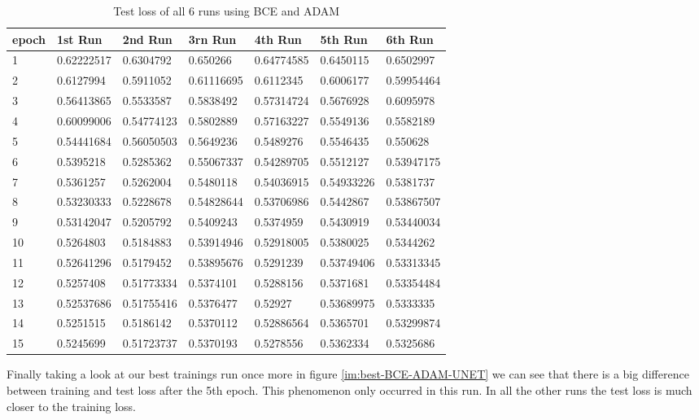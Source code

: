 \begin{table}[!ht]
    \centering
    \begin{tabular}{|l||l||l||l||l||l||l|}
    \hline
    epoch & 1st Run & 2nd Run & 3rn Run & 4th Run & 5th Run & 6th Run \\ \hline
        1 & 0.62222517 & 0.6304792 & 0.650266 & 0.64774585 & 0.6450115 & 0.6502997 \\ \hline
        2 & 0.6127994 & 0.5911052 & 0.61116695 & 0.6112345 & 0.6006177 & 0.59954464 \\ \hline
        3 & 0.56413865 & 0.5533587 & 0.5838492 & 0.57314724 & 0.5676928 & 0.6095978 \\ \hline
        4 & 0.60099006 & 0.54774123 & 0.5802889 & 0.57163227 & 0.5549136 & 0.5582189 \\ \hline
        5 & 0.54441684 & 0.56050503 & 0.5649236 & 0.5489276 & 0.5546435 & 0.550628 \\ \hline
        6 & 0.5395218 & 0.5285362 & 0.55067337 & 0.54289705 & 0.5512127 & 0.53947175 \\ \hline
        7 & 0.5361257 & 0.5262004 & 0.5480118 & 0.54036915 & 0.54933226 & 0.5381737 \\ \hline
        8 & 0.53230333 & 0.5228678 & 0.54828644 & 0.53706986 & 0.5442867 & 0.53867507 \\ \hline
        9 & 0.53142047 & 0.5205792 & 0.5409243 & 0.5374959 & 0.5430919 & 0.53440034 \\ \hline
        10 & 0.5264803 & 0.5184883 & 0.53914946 & 0.52918005 & 0.5380025 & 0.5344262 \\ \hline
        11 & 0.52641296 & 0.5179452 & 0.53895676 & 0.5291239 & 0.53749406 & 0.53313345 \\ \hline
        12 & 0.5257408 & 0.51773334 & 0.5374101 & 0.5288156 & 0.5371681 & 0.53354484 \\ \hline
        13 & 0.52537686 & 0.51755416 & 0.5376477 & 0.52927 & 0.53689975 & 0.5333335 \\ \hline
        14 & 0.5251515 & 0.5186142 & 0.5370112 & 0.52886564 & 0.5365701 & 0.53299874 \\ \hline
        15 & 0.5245699 & 0.51723737 & 0.5370193 & 0.5278556 & 0.5362334 & 0.5325686 \\ \hline
    \end{tabular}
    \caption{\label{tab:bce_adam_test}Test loss of all 6 runs using BCE and ADAM}
\end{table}


Finally taking a look at our best trainings run once more in figure \ref{im:best-BCE-ADAM-UNET} we can see that 
there is a big difference between training and test loss after the 5th epoch. This phenomenon only occurred in this
run. In all the other runs the test loss is much closer to the training loss. 


